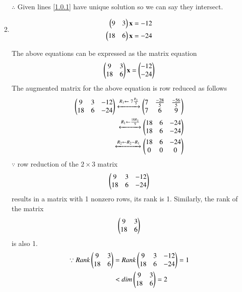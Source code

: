 \documentclass[journal,12pt,twocolumn]{IEEEtran}
\begin{document}
\begin{enumerate}
$\therefore$ Given lines \eqref{1.0.1} have unique solution so we can say they intersect.

\item
\begin{align}
\begin{split}
\begin{pmatrix}9 & 3 \end{pmatrix}\mathbf{x}&=-12
\\
\begin{pmatrix}18 & 6 \end{pmatrix}\mathbf{x}&=-24
\end{split}
\end{align}

The above equations can be expressed as the matrix equation
\begin{align}
\begin{pmatrix}9 & 3\\18 & 6\end{pmatrix} \mathbf{x} = \begin{pmatrix}-12\\-24\end{pmatrix}
\end{align}
%
The augmented matrix for the above equation is row reduced as follows
\begin{align}
\begin{pmatrix}9 & 3 & -12\\18 & 6 & -24 \end{pmatrix} 
\xleftrightarrow {R_1\leftarrow \ 7\frac{R_1}{5}}\begin{pmatrix}7 & \frac{-28}{5} & \frac{-56}{5}\\7 & 6 & 9\end{pmatrix} 
\\
\xleftrightarrow {R_1\leftarrow \frac{18R_1}{9}}\begin{pmatrix}18 & 6 & -24 \\18 & 6 & -24\end{pmatrix}
\\
\xleftrightarrow {R_2\leftarrow R_2-R_1}\begin{pmatrix}18 & 6 & -24 \\0 & 0 & 0\end{pmatrix}
\\
\end{align}
%
$\because$ row reduction of the $2\times 3$ matrix
%
\begin{align}
\begin{pmatrix}9 & 3 & -12\\18 & 6 & -24\end{pmatrix}
\end{align}
%
results in a matrix with 1 nonzero rows, its rank is 1. 
%
Similarly, the rank of the matrix 
\begin{align}
\begin{pmatrix}9 & 3 \\18 & 6 \end{pmatrix} 
\end{align}
%
is also 1.
%
\begin{align}
\because Rank \begin{pmatrix}9 & 3\\18 & 6\end{pmatrix} &= Rank\begin{pmatrix}9 & 3 & -12\\18 & 6 & -24\end{pmatrix}=1\nonumber\\
&< dim\begin{pmatrix}9 & 3\\18 & 6\end{pmatrix}=2
\end{align}


\end{enumerate}
\end{document}
